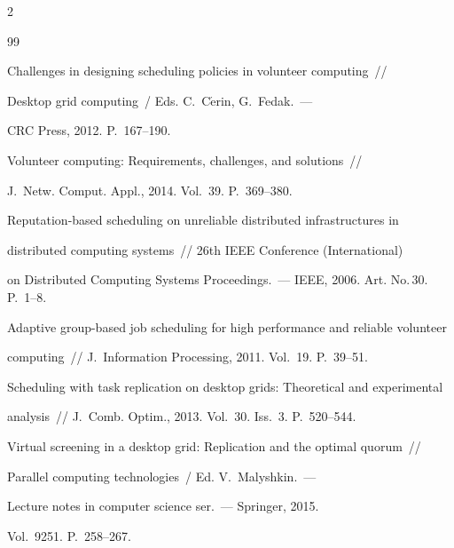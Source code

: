 \begin{multicols}{2}
{{\begin{thebibliography}{99}

Challenges in designing scheduling policies in volunteer computing~// 

Desktop grid computing~/ Eds. C.~C$\acute{\mbox{e}}$rin, G.~Fedak.~--- 

CRC Press, 2012. P.~167--190.



Volunteer computing: Requirements, challenges, and solutions~// 

J.~Netw. Comput. Appl., 2014. Vol.~39. P.~369--380.



 Reputation-based scheduling on unreliable distributed infrastructures in 

 distributed computing systems~// 26th IEEE Conference (International)

 on Distributed Computing Systems Proceedings.~--- IEEE, 2006. Art. No.\,30. P.~1--8.



Adaptive group-based job scheduling for high performance and reliable volunteer 

computing~// J.~Information Processing, 2011. Vol.~19. P.~39--51.





 Scheduling with task replication on desktop grids: Theoretical and experimental 

 analysis~// J.~Comb. Optim., 2013.  Vol.~30. Iss.~3. P.~520--544.

 



 Virtual screening in a desktop grid: Replication and the optimal quorum~// 

  Parallel computing technologies~/ Ed. V.~Malyshkin.~---

 Lecture notes in computer science ser.~---  Springer, 2015.  

 Vol.~9251. P.~258--267.

 


\end{thebibliography}}}
\end{multicols}
